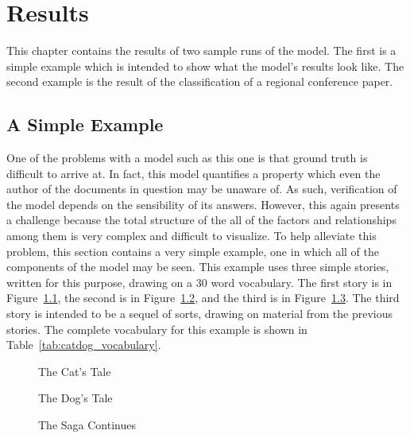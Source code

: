 \documentclass[../ut-dissertation.tex]{subfiles}
\begin{document}
\chapter{Results}
This chapter contains the results of two sample runs of the model.
The first is a simple example which is intended to show what the
model's results look like.  The second example is the result of the
classification of a regional conference paper.

\section{A Simple Example}
One of the problems with a model such as this one is that ground truth
is difficult to arrive at.  In fact, this model quantifies a property
which even the author of the documents in question may be unaware of.
As such, verification of the model depends on the sensibility of its
answers.  However, this again presents a challenge because the total
structure of the all of the factors and relationships among them is
very complex and difficult to visualize.  To help alleviate this
problem, this section contains a very simple example, one in which all
of the components of the model may be seen.  This example uses three
simple stories, written for this purpose, drawing on a 30 word
vocabulary.  The first story is in Figure~\ref{fig:cat_story}, the
second is in Figure~\ref{fig:dog_story}, and the third is in
Figure~\ref{fig:cat_dog_story}.  The third story is intended to be a
sequel of sorts, drawing on material from the previous stories.  The
complete vocabulary for this example is shown in
Table~\ref{tab:catdog_vocabulary}.
\begin{figure}
  \noindent{}
  \caption{The Cat's Tale}\label{fig:cat_story}
\end{figure}

\begin{figure}
  \noindent{}
  \caption{The Dog's Tale}\label{fig:dog_story}
\end{figure}

\begin{figure}
  \noindent{}
  \caption{The Saga Continues}\label{fig:cat_dog_story}
\end{figure}
\end{document}
